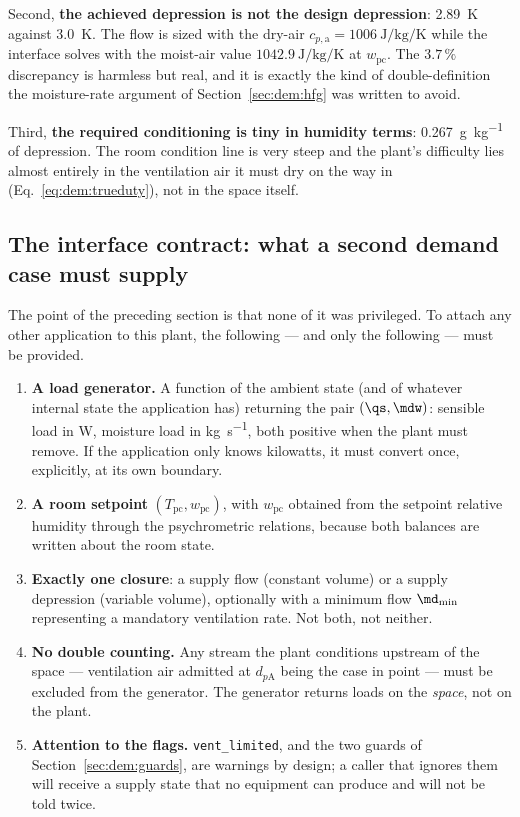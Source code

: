 Second, \textbf{the achieved depression is not the design depression}:
\SI{2.89}{\kelvin} against \SI{3.0}{\kelvin}. The flow is sized with the dry-air
$c_{p,\mathrm{a}}=\SI{1006}{\joule\per\kilogram\per\kelvin}$ while the interface
solves with the moist-air value $\SI{1042.9}{\joule\per\kilogram\per\kelvin}$ at
$w_{\mathrm{pc}}$. The $3.7\,\%$ discrepancy is harmless but real, and it is
exactly the kind of double-definition the moisture-rate argument of
Section~\ref{sec:dem:hfg} was written to avoid.

Third, \textbf{the required conditioning is tiny in humidity terms}:
\SI{0.267}{\gram\per\kilogram} of depression. The room condition line is very
steep and the plant's difficulty lies almost entirely in the ventilation air it
must dry on the way in (Eq.~\eqref{eq:dem:trueduty}), not in the space itself.

\subsection{The interface contract: what a second demand case must supply}
\label{sec:dem:contract}

The point of the preceding section is that none of it was privileged. To attach
any other application to this plant, the following --- and only the
following --- must be provided.

\begin{enumerate}[nosep]
\item \textbf{A load generator.} A function of the ambient state (and of
whatever internal state the application has) returning the pair
$(\qs,\mdw)$: sensible load in \si{\watt}, moisture load in
\si{\kilogram\per\second}, both positive when the plant must remove. If the
application only knows kilowatts, it must convert once, explicitly, at its own
boundary.
\item \textbf{A room setpoint} $(T_{\mathrm{pc}},w_{\mathrm{pc}})$, with
$w_{\mathrm{pc}}$ obtained from the setpoint relative humidity through the
psychrometric relations, because both balances are written about the room state.
\item \textbf{Exactly one closure}: a supply flow (constant volume) or a supply
depression (variable volume), optionally with a minimum flow $\md_{\min}$
representing a mandatory ventilation rate. Not both, not neither.
\item \textbf{No double counting.} Any stream the plant conditions upstream of
the space --- ventilation air admitted at $d_{p\mathrm{A}}$ being the case in
point --- must be excluded from the generator. The generator returns loads on the
\emph{space}, not on the plant.
\item \textbf{Attention to the flags.} \verb|vent_limited|, and the two guards of
Section~\ref{sec:dem:guards}, are warnings by design; a caller that ignores them
will receive a supply state that no equipment can produce and will not be told
twice.
\end{enumerate}

